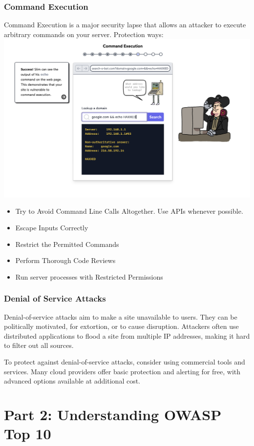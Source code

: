 \documentclass[12pt]{article}
\begin{document}
\subsubsection{Command Execution}
Command Execution is a major security lapse that allows an attacker to execute arbitrary commands on your server. Protection ways: \\
\includegraphics[width=.7\textwidth]{Image20.png} 
\begin{itemize}
    \item Try to Avoid Command Line Calls Altogether. Use APIs whenever possible.
    \item Escape Inputs Correctly
    \item Restrict the Permitted Commands
    \item Perform Thorough Code Reviews
    \item Run server processes with Restricted Permissions
\end{itemize}

\subsubsection{Denial of Service Attacks}
Denial-of-service attacks aim to make a site unavailable to users. They can be politically motivated, for extortion, or to cause disruption. Attackers often use distributed applications to flood a site from multiple IP addresses, making it hard to filter out all sources. 

To protect against denial-of-service attacks, consider using commercial tools and services. Many cloud providers offer basic protection and alerting for free, with advanced options available at additional cost.

\newpage

\section{Part 2: Understanding OWASP Top 10}
\end{document}
